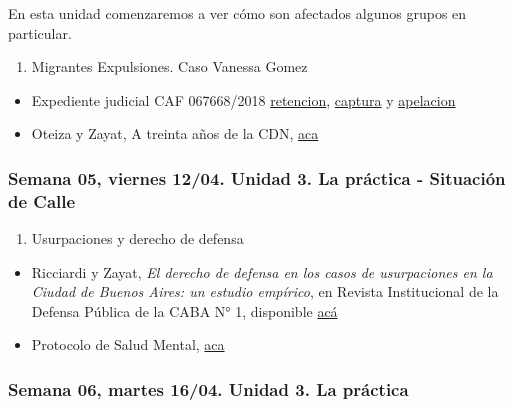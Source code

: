 \documentclass[
]{article}
\providecommand{\tightlist}{%
  \setlength{\itemsep}{0pt}\setlength{\parskip}{0pt}}
\begin{document}
En esta unidad comenzaremos a ver cómo son afectados algunos grupos en
particular.

\begin{enumerate}
\def\labelenumi{\alph{enumi}.}
\tightlist
\item
  Migrantes Expulsiones. Caso Vanessa Gomez
\end{enumerate}

\begin{itemize}
\tightlist
\item
  Expediente judicial CAF 067668/2018
  \href{https://drive.google.com/file/d/1MszNbvuQgl56ukSCbql4ggAAKyiia5Bs/view?usp=sharing}{retencion},
  \href{https://drive.google.com/file/d/11RSJ0lXuMKwhQy-gVHfODbc-AH1fBE0j/view?usp=sharing}{captura}
  y
  \href{https://drive.google.com/file/d/1xsXyT2y3F7sGL8yhK8kG6GTfhkYi7nVw/view?usp=sharing}{apelacion}
\item
  Oteiza y Zayat, A treinta años de la CDN,
  \href{https://drive.google.com/file/d/1rZbIfh3834THG1K07moFq1Cgp_zmYtsk/view?usp=sharing}{aca}
\end{itemize}

\hypertarget{semana-05-viernes-1204.-unidad-3.-la-pruxe1ctica---situaciuxf3n-de-calle}{%
\subsubsection{Semana 05, viernes 12/04. Unidad 3. La práctica -
Situación de
Calle}\label{semana-05-viernes-1204.-unidad-3.-la-pruxe1ctica---situaciuxf3n-de-calle}}

\begin{enumerate}
\def\labelenumi{\alph{enumi}.}
\setcounter{enumi}{1}
\tightlist
\item
  Usurpaciones y derecho de defensa
\end{enumerate}

\begin{itemize}
\item
  Ricciardi y Zayat, \emph{El derecho de defensa en los casos de
  usurpaciones en la Ciudad de Buenos Aires: un estudio empírico}, en
  Revista Institucional de la Defensa Pública de la CABA N° 1,
  disponible
  \href{https://drive.google.com/file/d/1KeqFSqkZ2aBrHXkRcIaZCVu6AMSaX7zH/view?usp=sharing}{acá}
\item
  Protocolo de Salud Mental,
  \href{https://drive.google.com/file/d/1_1DCvbeTGT8gLp9pAMsCejJeJPs-2mj2/view?usp=sharing}{aca}
\end{itemize}

\hypertarget{semana-06-martes-1604.-unidad-3.-la-pruxe1ctica}{%
\subsubsection{Semana 06, martes 16/04. Unidad 3. La
práctica}\label{semana-06-martes-1604.-unidad-3.-la-pruxe1ctica}}
\end{document}
